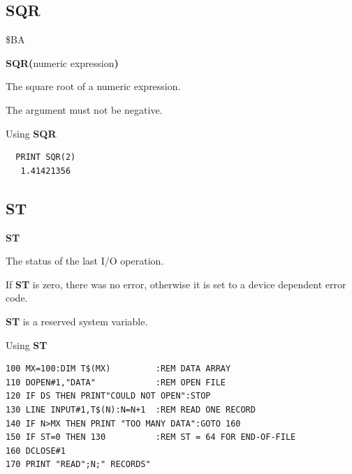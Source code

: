 
\newpage
\subsection{SQR}
\begin{description}[leftmargin=2cm,style=nextline]
\item [Token:] \$BA
\item [Format:] {\bf SQR(}numeric expression{\bf)}
\item [Returns:] The square root of a numeric expression.

\item [Remarks:] The argument must not be negative.
\item [Example:] Using {\bf SQR}
\begin{tcolorbox}[colback=black,coltext=white]
\verbatimfont{\codefont}
\begin{verbatim}
  PRINT SQR(2)
   1.41421356
\end{verbatim}
\end{tcolorbox}
\end{description}


\newpage
\subsection{ST}
\begin{description}[leftmargin=2cm,style=nextline]
\item [Format:] {\bf ST}
\item [Usage:]  The status of the last I/O operation.

                If {\bf ST} is zero, there was no error, otherwise
                it is set to a device dependent error code.
\item[Remarks:] {\bf ST} is a reserved system variable.
\item [Example:] Using {\bf ST}
\begin{tcolorbox}[colback=black,coltext=white]
\verbatimfont{\codefont}
\begin{verbatim}
100 MX=100:DIM T$(MX)         :REM DATA ARRAY
110 DOPEN#1,"DATA"            :REM OPEN FILE
120 IF DS THEN PRINT"COULD NOT OPEN":STOP
130 LINE INPUT#1,T$(N):N=N+1  :REM READ ONE RECORD
140 IF N>MX THEN PRINT "TOO MANY DATA":GOTO 160
150 IF ST=0 THEN 130          :REM ST = 64 FOR END-OF-FILE
160 DCLOSE#1
170 PRINT "READ";N;" RECORDS"
\end{verbatim}
\end{tcolorbox}
\end{description}

